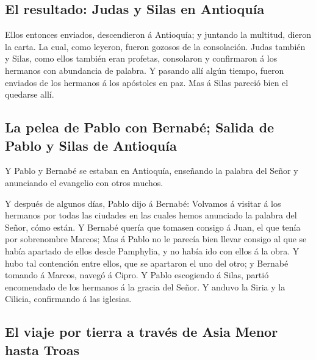 \hypertarget{el-resultado-judas-y-silas-en-antioquuxeda}{%
\subsection{El resultado: Judas y Silas en
Antioquía}\label{el-resultado-judas-y-silas-en-antioquuxeda}}

 Ellos entonces enviados, descendieron á Antioquía; y
juntando la multitud, dieron la carta.  La cual, como
leyeron, fueron gozosos de la consolación.  Judas también y
Silas, como ellos también eran profetas, consolaron y confirmaron á los
hermanos con abundancia de palabra.  Y pasando allí algún
tiempo, fueron enviados de los hermanos á los apóstoles en paz.
 Mas á Silas pareció bien el quedarse allí.

\hypertarget{la-pelea-de-pablo-con-bernabuxe9-salida-de-pablo-y-silas-de-antioquuxeda}{%
\subsection{La pelea de Pablo con Bernabé; Salida de Pablo y Silas de
Antioquía}\label{la-pelea-de-pablo-con-bernabuxe9-salida-de-pablo-y-silas-de-antioquuxeda}}

 Y Pablo y Bernabé se estaban en Antioquía, enseñando la
palabra del Señor y anunciando el evangelio con otros muchos.

 Y después de algunos días, Pablo dijo á Bernabé: Volvamos
á visitar á los hermanos por todas las ciudades en las cuales hemos
anunciado la palabra del Señor, cómo están.  Y Bernabé
quería que tomasen consigo á Juan, el que tenía por sobrenombre Marcos;
 Mas á Pablo no le parecía bien llevar consigo al que se
había apartado de ellos desde Pamphylia, y no había ido con ellos á la
obra.  Y hubo tal contención entre ellos, que se apartaron
el uno del otro; y Bernabé tomando á Marcos, navegó á Cipro.
 Y Pablo escogiendo á Silas, partió encomendado de los
hermanos á la gracia del Señor.  Y anduvo la Siria y la
Cilicia, confirmando á las iglesias.

\hypertarget{el-viaje-por-tierra-a-travuxe9s-de-asia-menor-hasta-troas}{%
\subsection{El viaje por tierra a través de Asia Menor hasta
Troas}\label{el-viaje-por-tierra-a-travuxe9s-de-asia-menor-hasta-troas}}

